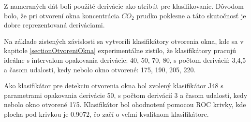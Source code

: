 Z nameraných dát boli použité derivácie ako atribút pre klasifikovanie. Dôvodom bolo, že pri otvorení okna koncentrácia $CO_2$ prudko poklesne a táto skutočnosť je dobre reprezentovaná deriváciami. 

Na základe zistených závislosti sa vytvorili klasifikátory otvorenia okna, kde sa v kapitole \ref{sectionOtvoreniOkna} experimentálne zistilo, že klasifikátory pracujú ideálne s intervalom opakovania derivácie: 40, 50, 70, 80, s počtom derivácií: 3,4,5 a časom udalosti, kedy nebolo okno otvorené: 175, 190, 205, 220.

Ako klasifikátor pre detekciu otvorenia okna bol zvolený klasifikátor J48 s parametrami opakovania derivácie 50, s počtom derivácií 3 a časom udalosti, kedy nebolo okno otvorené 175. Klasifikátor bol ohodnotení pomocou ROC krivky, kde plocha pod krivkou je 0.9072, čo začí o veľmi kvalitnom klasifikátore.










